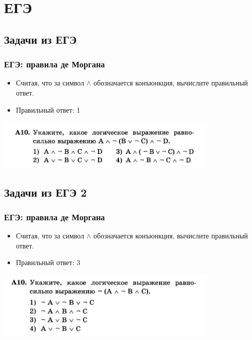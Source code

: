 \documentclass[compress,red]{beamer}
\begin{document}
\section{ЕГЭ}

\subsection{Задачи из ЕГЭ}
\begin{frame}[fragile]
  \frametitle{ЕГЭ: правила де Моргана}
  \begin{itemize}
      \item<1->Считая, что за символ $\wedge$ обозначается конъюнкция, вычислите правильный ответ.
      \item<2->Правильный ответ: 1
  \end{itemize}
  \centerline{\includegraphics[width=0.8\textwidth]{images/logic-01.png}}
\end{frame}

\subsection{Задачи из ЕГЭ 2}
\begin{frame}[fragile]
  \frametitle{ЕГЭ: правила де Моргана}
  \begin{itemize}
      \item<1->Считая, что за символ $\wedge$ обозначается конъюнкция, вычислите правильный ответ.
      \item<2->Правильный ответ: 3
  \end{itemize}
  \centerline{\includegraphics[width=0.8\textwidth]{images/logic-02.png}}
\end{frame}
\end{document}
